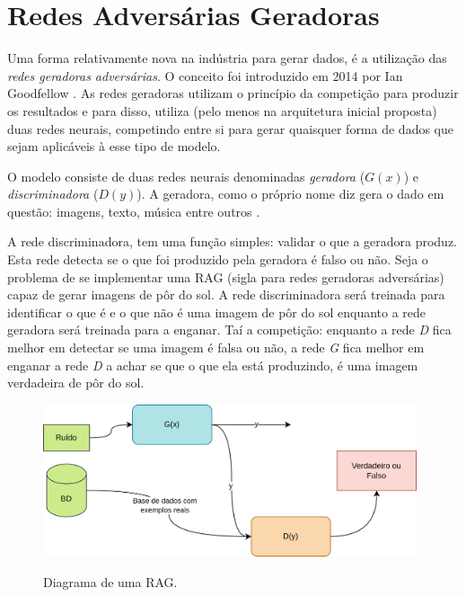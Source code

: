 \section{Redes Adversárias Geradoras}
\label{sec:gan}

Uma forma relativamente nova na indústria para gerar dados, é a utilização das \textit{redes geradoras adversárias}. O conceito foi introduzido em 2014 por Ian Goodfellow \cite{goodfellow_generative_2014}. As redes geradoras utilizam o princípio da competição para produzir os resultados e para disso, utiliza (pelo menos na arquitetura inicial proposta) duas redes neurais, competindo entre si para gerar quaisquer forma de dados que sejam aplicáveis à esse tipo de modelo.

O modelo consiste de duas redes neurais denominadas \textit{geradora} ($G(x)$) e \textit{discriminadora} ($D(y)$). A geradora, como o próprio nome diz gera o dado em questão: imagens, texto, música entre outros \cite{c_han_gan-based_2018, xu_diversity-promoting_2018, oza_progressive_2019}. 

A rede discriminadora, tem uma função simples: validar o que a geradora produz. Esta rede detecta se o que foi produzido pela geradora é falso ou não. Seja o problema de se implementar uma RAG (sigla para redes geradoras adversárias) capaz de gerar imagens de pôr do sol. A rede discriminadora será treinada para identificar o que é e o que não é uma imagem de pôr do sol enquanto a rede geradora será treinada para a enganar. Taí a competição: enquanto a rede \textit{D} fica melhor em detectar se uma imagem é falsa ou não, a rede \textit{G} fica melhor em enganar a rede \textit{D} a achar se que o que ela está produzindo, é uma imagem verdadeira de pôr do sol.

\begin{figure}[H]
    \centering
    \caption{Diagrama de uma RAG.}
    \includegraphics[width=11cm]{fig/GAN_2.png}
    \label{fig:fig7}
\end{figure}

